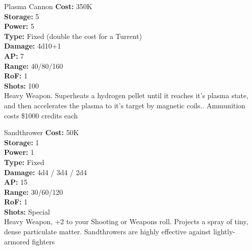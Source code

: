 \begin{multicols}{2}
\begin{genericsection}{Plasma Cannon}
\textbf{Cost:} 350K\\
\textbf{Storage:} 5\\
\textbf{Power:} 5\\
\textbf{Type:} Fixed (double the cost for a Turrent)\\
\textbf{Damage:} 4d10+1\\
\textbf{AP:} 7\\
\textbf{Range:} 40/80/160\\
\textbf{RoF:} 1\\
\textbf{Shots:} 100\\
Heavy Weapon. Superheats a hydrogen pellet until it reaches it’s plasma state, and then accelerates the plasma to it’s target by magnetic coils.. Ammunition costs \$1000 credits each
\end{genericsection}

\begin{genericsection}{Sandthrower}
\textbf{Cost:} 50K\\
\textbf{Storage:} 1\\
\textbf{Power:} 1\\
\textbf{Type:} Fixed\\
\textbf{Damage:} 4d4 / 3d4 / 2d4\\
\textbf{AP:} 15\\
\textbf{Range:} 30/60/120\\
\textbf{RoF:} 1\\
\textbf{Shots:} Special\\
Heavy Weapon, +2 to your Shooting or Weapons roll. Projects a spray of tiny, dense particulate matter. Sandthrowers are highly effective against lightly-armored fighters
\end{genericsection}

\end{multicols}
